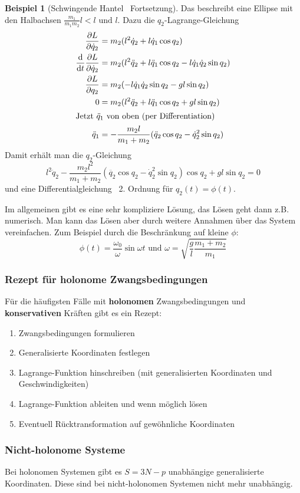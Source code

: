 \documentclass[oneside]{book}
\theoremstyle{definition}
\newtheorem*{beispiel*}{Beispiel}
\newcommand{\Dgl}{Differentialgleichung}
\renewcommand{\d}{\mathrm d}
\newcommand{\dd}[1]{\frac{\d}{\d #1}}
\newcommand{\ffpartial}[2]{\frac{\partial #1}{\partial #2}}
\begin{document}
\begin{beispiel*}[Schwingende Hantel \textendash~Fortsetzung]
	Das beschreibt eine Ellipse mit den Halbachsen $\frac{m_1}{m_1 m_2}l < l \text{~und~} l$.
	Dazu die $q_2$-Lagrange-Gleichung
	\begin{align*}
	\ffpartial{L}{\dot{q}_2} &= m_2 (l^2 \dot{q}_2 + l \dot{q}_1 \cos q_2)\\
	\dd t \ffpartial{L}{\dot{q}_2} &= m_2 (l^2 \ddot{q}_2 + l \ddot{q}_1 \cos q_2 - l \dot{q}_1 \dot{q}_2 \sin q_2)\\
	\ffpartial{L}{q_2} &= m_2 (- l \dot{q}_1 \dot{q}_2 \sin q_2 - g l \sin q_2)\\
	0 &= m_2 (l^2 \ddot{q}_2 + l \ddot{q}_1 \cos q_2 + g l \sin q_2)\\
	\intertext{Jetzt $\ddot{q}_1$ von oben (per Differentiation)}
	\ddot{q}_1 &= - \frac{m_2 l}{m_1 + m_2} (\ddot{q}_2 \cos q_2 - \dot{q}_2^2 \sin q_2)
	\end{align*}
	Damit erhält man die $q_2$-Gleichung
	$$l^2 \ddot{q}_2 - \frac{m_2 l^2}{m_1 + m_2}(\ddot{q_2} \cos q_2 - \dot{q}_2^2 \sin q_2) \cos q_2 + g l \sin q_2 = 0$$
	und eine \Dgl~ 2. Ordnung für $q_2(t) = \phi(t)$.
	
	Im allgemeinen gibt es eine sehr kompliziere Lösung, das Lösen geht dann z.B. numerisch. Man kann das Lösen aber durch weitere Annahmen über das System vereinfachen. Zum Beispiel durch die Beschränkung auf kleine $\phi$:
	$$\phi(t) = \frac{\omega_0}{\omega} \sin \omega t \text{~und~} \omega = \sqrt{\frac{g}{l} \frac{m_1 + m_2}{m_1}}$$
\end{beispiel*}


\subsubsection{Rezept für holonome Zwangsbedingungen}

Für die häufigsten Fälle mit \textbf{holonomen} Zwangsbedingungen und \textbf{konservativen} Kräften gibt es ein Rezept:
\begin{enumerate}
\item Zwangsbedingungen formulieren
\item Generalisierte Koordinaten festlegen
\item Lagrange-Funktion hinschreiben (mit generalisierten Koordinaten und Geschwindigkeiten)
\item Lagrange-Funktion ableiten und wenn möglich lösen
\item Eventuell Rücktransformation auf gewöhnliche Koordinaten
\end{enumerate}

\subsubsection{Nicht-holonome Systeme}
Bei holonomen Systemen gibt es $S = 3N - p$ unabhängige generalisierte Koordinaten. Diese sind bei nicht-holonomen Systemen nicht mehr unabhängig.
\end{document}

